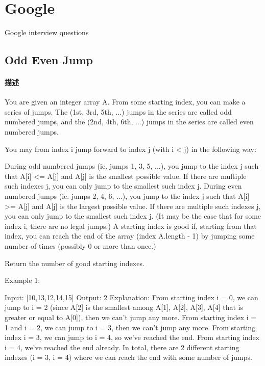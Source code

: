 \chapter{Google}
Google interview questions
\newline

\section{Odd Even Jump} %
\label{sec:odd-even-jump}


\subsubsection{描述}
You are given an integer array A.  From some starting index, you can make a series of jumps.  The (1st, 3rd, 5th, ...) jumps in the series are called odd numbered jumps, and the (2nd, 4th, 6th, ...) jumps in the series are called even numbered jumps.

You may from index i jump forward to index j (with i < j) in the following way:

During odd numbered jumps (ie. jumps 1, 3, 5, ...), you jump to the index j such that A[i] <= A[j] and A[j] is the smallest possible value.  If there are multiple such indexes j, you can only jump to the smallest such index j.
During even numbered jumps (ie. jumps 2, 4, 6, ...), you jump to the index j such that A[i] >= A[j] and A[j] is the largest possible value.  If there are multiple such indexes j, you can only jump to the smallest such index j.
(It may be the case that for some index i, there are no legal jumps.)
A starting index is good if, starting from that index, you can reach the end of the array (index A.length - 1) by jumping some number of times (possibly 0 or more than once.)

Return the number of good starting indexes.

Example 1:
\begin{Code}
Input: [10,13,12,14,15]
Output: 2
Explanation:
From starting index i = 0, we can jump to i = 2 (since A[2] is the smallest among A[1], A[2], A[3], A[4] that is greater or equal to A[0]), then we can't jump any more.
From starting index i = 1 and i = 2, we can jump to i = 3, then we can't jump any more.
From starting index i = 3, we can jump to i = 4, so we've reached the end.
From starting index i = 4, we've reached the end already.
In total, there are 2 different starting indexes (i = 3, i = 4) where we can reach the end with some number of jumps.
\end{Code}


